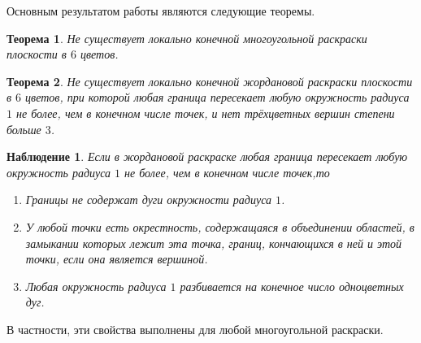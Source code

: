 \documentclass[12pt,a4paper]{article}
\newtheorem{theorem}{Теорема}
\newtheorem{observation}{Наблюдение}
\begin{document}
Основным результатом работы являются следующие теоремы.

\begin{theorem} \label{t1}
	Не существует локально конечной многоугольной раскраски плоскости в $6$ цветов.
\end{theorem}

\begin{theorem} \label{t2}
	Не существует локально конечной жордановой раскраски плоскости в $6$ цветов, при которой любая граница пересекает любую окружность радиуса $1$ не более, чем в конечном числе точек, и нет трёхцветных вершин степени больше $3$.
\end{theorem}


\begin{observation} \label{l0.1}
    Если в жордановой раскраске любая граница пересекает любую окружность радиуса $1$ не более, чем в конечном числе точек,то
    \begin{enumerate}
        \item Границы не содержат дуги окружности радиуса $1$.
        \item У любой точки есть окрестность, содержащаяся в объединении областей, в замыкании которых лежит эта точка, границ, кончающихся в ней и этой точки, если она является вершиной.
        \item Любая окружность радиуса $1$ разбивается на конечное число одноцветных дуг.
    \end{enumerate}
\end{observation}

В частности, эти свойства выполнены для любой многоугольной раскраски.
\end{document}
